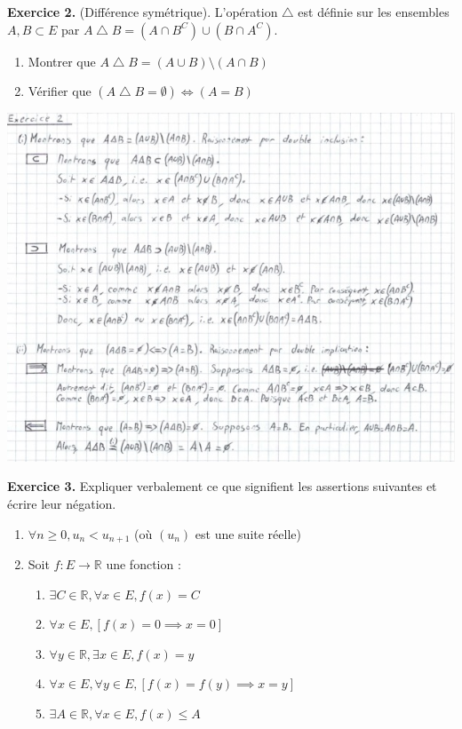 \documentclass[a4paper, 10pt]{report}
\begin{document}
	\newpage
	
	\fancyhf{}
	\renewcommand{\headrule}
	{\rule{\textwidth}{0pt}}
	
	\noindent
	\textbf{Exercice 2.} (Différence symétrique). L'opération
	$\bigtriangleup$ est définie sur les ensembles $A, B \subset E$
	par $A \bigtriangleup B = (A \cap B^C) \cup (B \cap A^C)$.
	
	\begin{enumerate}[label=(\roman*)]
		\item Montrer que $A \bigtriangleup B =
			(A \cup B) \setminus (A \cap B)$
		\item Vérifier que $(A \bigtriangleup B = \emptyset)
			\iff (A = B)$
	\end{enumerate}
	
	\includegraphics{ex02.jpg}
	
	\newpage
	
	\noindent
	\textbf{Exercice 3.} Expliquer verbalement ce que signifient les
	assertions suivantes et écrire leur négation.
	
	\begin{enumerate}[label=(\roman*)]
		\item $\forall n \geq 0, u_n < u_{n+1}$
		(où $(u_n)$ est une suite réelle)
		\item Soit $f : E \to \mathbb{R}$ une fonction :
		\begin{enumerate}[label=(\alph*)]
			\item $\exists C \in \mathbb{R},
				\forall x \in E,
				f(x) = C$
			\item $\forall x \in E,
				[f(x) = 0 \implies x = 0]$
			\item $\forall y \in \mathbb{R},
				\exists x \in E,
				f(x) = y$
			\item $\forall x \in E,
				\forall y \in E,
				[f(x) = f(y) \implies x = y]$
			\item $\exists A \in \mathbb{R},
				\forall x \in E,
				f(x) \leq A$
		\end{enumerate}
	\end{enumerate}
	
\end{document}
